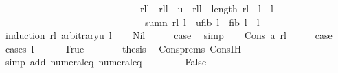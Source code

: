 \begin{isabellebody}
\ \ \ \ \ \ \ \ \ \ \ \ \ \ \ \ \ \ \ \ \ \ \ \ \ \ \ \ \ rl{\isacharbang}{\isacharparenleft}l{\isacharminus}{}{\isacharparenright}\ {\isacharless}\ rl{\isacharbang}{\isacharparenleft}l{\isacharminus}{}{\isacharparenright}\ {\isasymLongrightarrow}\ u\ {\isasymle}\ rl{\isacharbang}{\isacharparenleft}l{\isacharminus}{}{\isacharparenright}\ {\isasymLongrightarrow}\ length\ rl\ {\isacharequal}\ l\ {\isasymLongrightarrow}\ l{\isasymge}{}\isanewline
\ \ \ \ \ \ \ \ \ \ \ \ \ \ \ \ \ \ \ \ \ \ \ \ \ \ \ \ \ {\isasymLongrightarrow}\ sumn\ rl\ l\ {\isasymge}\ u{\isacharasterisk}{\isacharparenleft}{\isacharparenleft}fib\ {\isacharparenleft}l{\isacharplus}{}{\isacharparenright}{\isacharparenright}{\isacharminus}{}{\isacharparenright}\ {\isacharplus}\ {\isacharparenleft}{\isacharparenleft}fib{}\ {\isacharparenleft}l{\isacharplus}{}{\isacharparenright}{\isacharparenright}\ {\isacharminus}\ {\isacharparenleft}l{\isacharplus}{}{\isacharparenright}{\isacharparenright}{\isachardoublequoteclose}\isanewline
%
\isadelimproof
%
\endisadelimproof
%
\isatagproof
{}\isamarkupfalse%
\ {\isacharparenleft}induction\ rl\ arbitrary{\isacharcolon}u\ l{\isacharparenright}\isanewline
\ \ \isamarkupfalse%
\ Nil\isanewline
\ \ \isamarkupfalse%
\ \isamarkupfalse%
\ {\isacharquery}case\ \isamarkupfalse%
\ simp\isanewline
{}\isamarkupfalse%
\isanewline
\ \ \isamarkupfalse%
\ {\isacharparenleft}Cons\ a\ rl{\isacharparenright}\isanewline
\ \ \isamarkupfalse%
\ \isamarkupfalse%
\ {\isacharquery}case\isanewline
\ \ \isamarkupfalse%
\ {\isacharparenleft}cases\ {\isachardoublequoteopen}l{\isacharequal}{}{\isachardoublequoteclose}{\isacharparenright}\isanewline
\ \ \ \ \isamarkupfalse%
\ True\isanewline
\ \ \ \ \isamarkupfalse%
\ \isamarkupfalse%
\ {\isacharquery}thesis\ \isamarkupfalse%
\ Cons{\isachardot}prems\ Cons{\isachardot}IH\isanewline
\ \ \ \ \ \ \isamarkupfalse%
\ {\isacharparenleft}simp\ add{\isacharcolon}\ numeral{\isacharunderscore}{}{\isacharunderscore}eq{\isacharunderscore}{}\ numeral{\isacharunderscore}{}{\isacharunderscore}eq{\isacharunderscore}{}{\isacharparenright}\isanewline
\ \ \isamarkupfalse%
\isanewline
\ \ \ \ \isamarkupfalse%
\ False\isanewline

\end{isabellebody}
